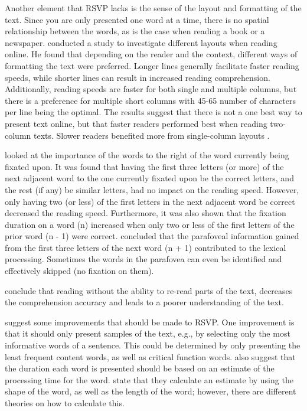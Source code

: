 Another element that RSVP lacks is the sense of the layout and formatting of the text. Since you are only presented one word at a time, there is no spatial relationship between the words, as is the case when reading a book or a newspaper.  conducted a study to investigate different layouts when reading online. He found that depending on the reader and the context, different ways of formatting the text were preferred. Longer lines generally facilitate faster reading speeds, while shorter lines can result in increased reading comprehension. Additionally, reading speeds are faster for both single and multiple columns, but there is a preference for multiple short columns with 45-65 number of characters per line being the optimal. The results suggest that there is not a one best way to present text online, but that faster readers performed best when reading two-column texts. Slower readers benefited more from single-column layouts \cite{baker_is_2005}.

 looked at the importance of the words to the right of the word currently being fixated upon. It was found that having the first three letters (or more) of the next adjacent word to the one currently fixated upon be the correct letters, and the rest (if any) be similar letters, had no impact on the reading speed. However, only having two (or less) of the first letters in the next adjacent word be correct decreased the reading speed. Furthermore, it was also shown that the fixation duration on a word (n) increased when only two or less of the first letters of the prior word (n - 1) were correct. \citeauthor{eyeMovement} concluded that the parafoveal information gained from the first three letters of the next word (n + 1) contributed to the lexical processing. Sometimes the words in the parafovea can even be identified and effectively skipped (no fixation on them).

\citeauthor{schotter_dont_2014} conclude that reading without the ability to re-read parts of the text, decreases the comprehension accuracy and leads to a poorer understanding of the text.


 suggest some improvements that should be made to RSVP. One improvement is that it should only present samples of the text, e.g., by selecting only the most informative words of a sentence. This could be determined by only presenting the least frequent content words, as well as critical function words. \citeauthor{rsvp_critique} also suggest that the duration each word is presented should be based on an estimate of the processing time for the word.  state that they calculate an estimate by using the shape of the word, as well as the length of the word; however, there are different theories on how to calculate this.